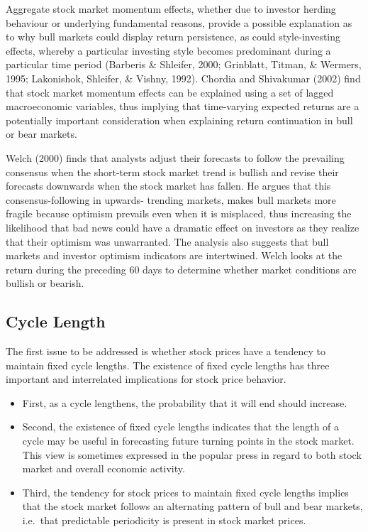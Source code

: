 \documentclass[]{book}
\providecommand{\tightlist}{%
  \setlength{\itemsep}{0pt}\setlength{\parskip}{0pt}}
\begin{document}
Aggregate stock market momentum effects, whether due to investor herding behaviour or underlying fundamental reasons, provide a possible explanation as to why bull markets could display return persistence, as could style-investing effects, whereby a particular investing style becomes predominant during a particular time period (Barberis \& Shleifer, 2000; Grinblatt, Titman, \& Wermers, 1995; Lakonishok, Shleifer, \& Vishny, 1992). Chordia and Shivakumar (2002) find that stock market momentum effects can be explained using a set of lagged macroeconomic variables, thus implying that time-varying expected returns are a potentially important consideration when explaining return continuation in bull or bear markets.

Welch (2000) finds that analysts adjust their forecasts to follow the prevailing consensus when the short-term stock market trend is bullish and revise their forecasts downwards when the stock market has fallen. He argues that this consensus-following in upwards- trending markets, makes bull markets more fragile because optimism prevails even when it is misplaced, thus increasing the likelihood that bad news could have a dramatic effect on investors as they realize that their optimism was unwarranted. The analysis also suggests that bull markets and investor optimism indicators are intertwined. Welch looks at the return during the preceding 60 days to determine whether market conditions are bullish or bearish.

\hypertarget{cycle-length}{%
\subsection{Cycle Length}\label{cycle-length}}

The first issue to be addressed is whether stock prices have a tendency to maintain fixed cycle lengths. The existence of fixed cycle lengths has three important and interrelated implications for stock price behavior.

\begin{itemize}
\tightlist
\item
  First, as a cycle lengthens, the probability that it will end should increase.
\item
  Second, the existence of fixed cycle lengths indicates that the length of a cycle may be useful in forecasting future turning points in the stock market. This view is sometimes expressed in the popular press in regard to both stock market and overall economic activity.
\item
  Third, the tendency for stock prices to maintain fixed cycle lengths implies that the stock market follows an alternating pattern of bull and bear markets, i.e.~that predictable periodicity is present in stock market prices. \citep{cochran1995duration}
\end{itemize}
\end{document}
